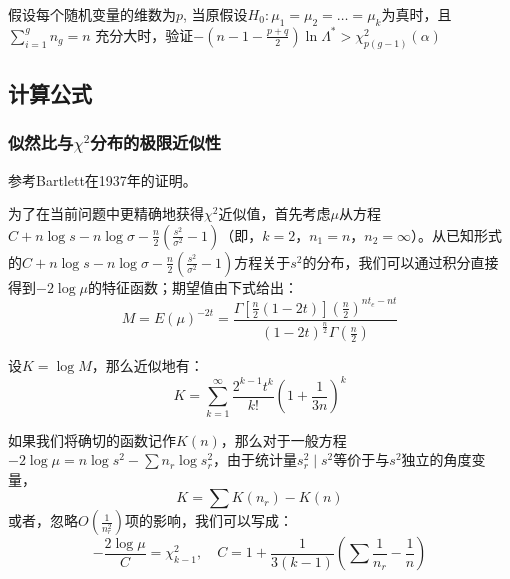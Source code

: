 \documentclass{article} %
\begin{document}
假设每个随机变量的维数为\(p\), 当原假设\(H_0: \mu_1=\mu_2=\hdots=\mu_k\)为真时，且\(\sum_{i=1}^{g} n_{g}=n\) 充分大时，验证\(-\left(n-1-\frac{p+q}{2}\right) \ln \Lambda^\ast > \chi^2_{p(g-1)}(\alpha)\)

\subsection{计算公式}





\subsubsection{似然比与\(\chi^2\)分布的极限近似性}
参考Bartlett在1937年的证明。
\begin{framed}
为了在当前问题中更精确地获得\(\chi^{2}\)近似值，首先考虑\(\mu\)从方程\(C+n\log s-n\log\sigma-\frac{n}{2}\left( \frac{s^2}{\sigma^2} - 1\right)\)（即，\(k = 2\)，\(n_1= n\)，\(n_2=\infty\)）。从已知形式的\(C+n\log s-n\log\sigma-\frac{n}{2}\left( \frac{s^2}{\sigma^2} - 1\right)\)方程关于\(s^2\)的分布，我们可以通过积分直接得到\(-2 \log \mu\)的特征函数；期望值由下式给出：
\[
M=E(\mu)^{-2t}=\frac{\Gamma[\frac{n}{2}(1-2t)](\frac{n}{2})^{nt_e-nt}}{(1-2t)^{\frac{n}{2}}\Gamma(\frac{n}{2})}
\]

设\(K=\log M\)，那么近似地有：
\[
K=\sum_{k=1}^{\infty} \frac{2^{k-1} t^{k}}{k!} \left( 1+\frac{1}{3n} \right)^k
\]

如果我们将确切的函数记作\(K(n)\)，那么对于一般方程\(-2\log\mu=n\log s^2-\sum n_r \log s_r^2\)，由于统计量\(s_{r}^2 \mid s^{2}\)等价于与\(s^2\)独立的角度变量，
\[
K=\sum K(n_r)-K(n)
\]
或者，忽略\(O\left( {\frac{1}{n_{r}^{2}}} \right)\)项的影响，我们可以写成：
\[
-\frac{2\log\mu}{C}=\chi_{k-1}^{2},\quad C=1+\frac{1}{3(k-1)}\left(\sum\frac{1}{n_{r}}-\frac{1}{n}\right)
\]
\end{framed}
\end{document}
